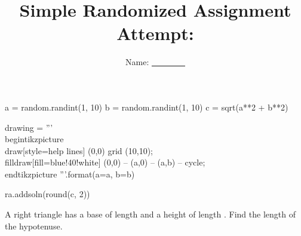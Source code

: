 \documentclass{article}
\title{Simple Randomized Assignment \\ {\Large Attempt: }}
\author{Name: \underline{~~~~~~~~}}
\begin{document}
\maketitle

\begin{pycode}
a = random.randint(1, 10)
b = random.randint(1, 10)
c = sqrt(a**2 + b**2)

drawing = '''
\\begin{{tikzpicture}}
\\draw[style=help lines] (0,0) grid (10,10);
\\filldraw[fill=blue!40!white] (0,0) -- ({a},0) -- ({a},{b}) -- cycle;
\\end{{tikzpicture}}
'''.format(a=a, b=b)

ra.addsoln(round(c, 2))
\end{pycode}

A right triangle has a base of length  and a height of length .  Find the length of the hypotenuse.
\begin{center}
\end{center}
\end{document}
